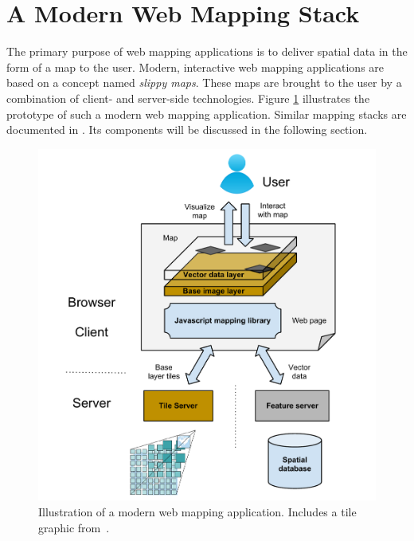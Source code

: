 
%
%

\section{A Modern Web Mapping Stack}
\label{chapter:web-mapping-stack}

The primary purpose of web mapping applications is to deliver spatial data in the form of a map to the user. Modern, interactive web mapping applications are based on a concept named \textit{slippy maps}. These maps are brought to the user by a combination of client- and server-side technologies. Figure \ref{fig:web-mapping-stack} illustrates the prototype of such a modern web mapping application. Similar mapping stacks are documented in 
\cite{Schuetze07smart, mitchell2008web, Miler10webis, McArdle10arch}. Its components will be discussed in the following section.


\begin{figure}[h]
  \begin{center}
    \includegraphics[width=1\textwidth]{figures/web_mapping_stack.pdf}
    \caption{Illustration of a modern web mapping application. Includes a tile graphic from~\cite{web:cubeservtiles}.}
    \label{fig:web-mapping-stack}
  \end{center}
\end{figure}


